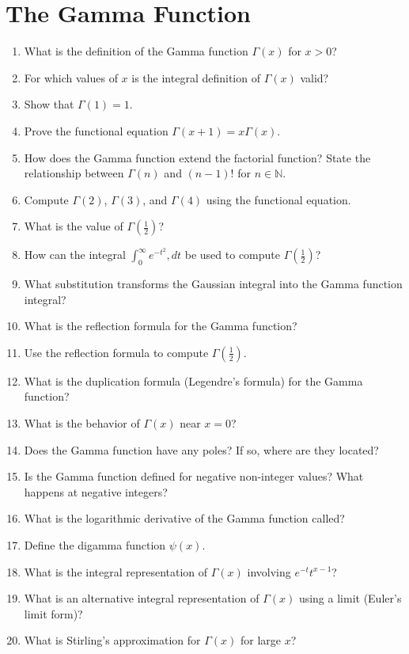 \section{The Gamma Function}
\begin{enumerate}
  \item What is the definition of the Gamma function $\Gamma(x)$ for $x > 0$?
  \item For which values of $x$ is the integral definition of $\Gamma(x)$ valid?
  \item Show that $\Gamma(1) = 1$.
  \item Prove the functional equation $\Gamma(x+1) = x\Gamma(x)$.
  \item How does the Gamma function extend the factorial function? State the relationship between $\Gamma(n)$ and $(n-1)!$ for $n \in \mathbb{N}$.
  \item Compute $\Gamma(2)$, $\Gamma(3)$, and $\Gamma(4)$ using the functional equation.
  \item What is the value of $\Gamma\left(\tfrac{1}{2}\right)$?
  \item How can the integral $\int_0^\infty e^{-t^2},dt$ be used to compute $\Gamma\left(\tfrac{1}{2}\right)$?
  \item What substitution transforms the Gaussian integral into the Gamma function integral?
  \item What is the reflection formula for the Gamma function?
  \item Use the reflection formula to compute $\Gamma\left(\tfrac{1}{2}\right)$.
  \item What is the duplication formula (Legendre's formula) for the Gamma function?
  \item What is the behavior of $\Gamma(x)$ near $x = 0$?
  \item Does the Gamma function have any poles? If so, where are they located?
  \item Is the Gamma function defined for negative non-integer values? What happens at negative integers?
  \item What is the logarithmic derivative of the Gamma function called?
  \item Define the digamma function $\psi(x)$.
  \item What is the integral representation of $\Gamma(x)$ involving $e^{-t} t^{x-1}$?
  \item What is an alternative integral representation of $\Gamma(x)$ using a limit (Euler's limit form)?
  \item What is Stirling's approximation for $\Gamma(x)$ for large $x$?

\end{enumerate}
